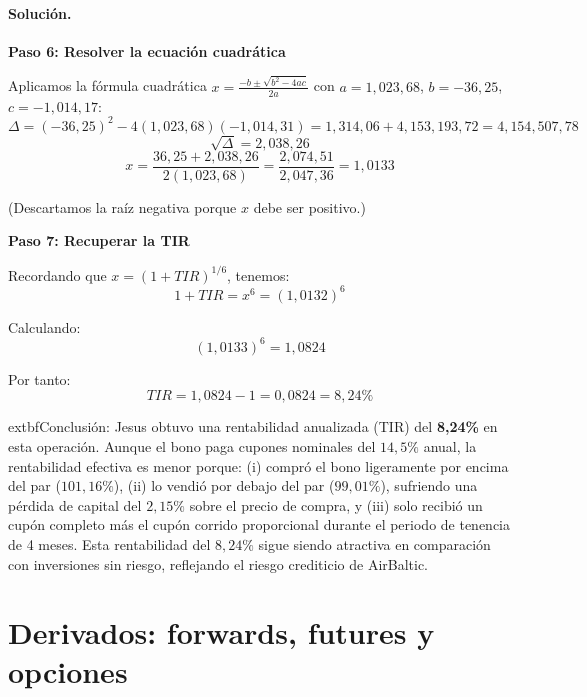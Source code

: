 \documentclass[12pt,a4paper]{article}
\newenvironment{solucion}{\paragraph{Solución.}}{}
\begin{document}
\begin{solucion}
\begin{enumerate}[label=\alph*)]
  \textbf{Paso 6: Resolver la ecuación cuadrática}
  
  Aplicamos la fórmula cuadrática \(x = \frac{-b \pm \sqrt{b^2 - 4ac}}{2a}\) con \(a = 1{,}023{,}68\), \(b = -36{,}25\), \(c = -1{,}014{,}17\):
  \[
  \Delta = (-36{,}25)^2 - 4(1{,}023{,}68)(-1{,}014{,}31) = 1{,}314{,}06 + 4{,}153{,}193{,}72 = 4{,}154{,}507{,}78
  \]
  \[
  \sqrt{\Delta} = 2{,}038{,}26
  \]
  \[
  x = \frac{36{,}25 + 2{,}038{,}26}{2(1{,}023{,}68)} = \frac{2{,}074{,}51}{2{,}047{,}36} = 1{,}0133
  \]
  
  (Descartamos la raíz negativa porque \(x\) debe ser positivo.)
  
  \textbf{Paso 7: Recuperar la TIR}
  
  Recordando que \(x = (1+TIR)^{1/6}\), tenemos:
  \[
  1 + TIR = x^6 = (1{,}0132)^6
  \]
  
  Calculando:
  \[
  (1{,}0133)^6 = 1{,}0824
  \]
  
  Por tanto:
  \[
  TIR = 1{,}0824 - 1 = 0{,}0824 = 8{,}24\%
  \]
  
  	extbf{Conclusión:} Jesus obtuvo una rentabilidad anualizada (TIR) del \textbf{8{,}24\%} en esta operación. Aunque el bono paga cupones nominales del \(14{,}5\%\) anual, la rentabilidad efectiva es menor porque: (i) compró el bono ligeramente por encima del par (\(101{,}16\%\)), (ii) lo vendió por debajo del par (\(99{,}01\%\)), sufriendo una pérdida de capital del \(2{,}15\%\) sobre el precio de compra, y (iii) solo recibió un cupón completo más el cupón corrido proporcional durante el periodo de tenencia de 4 meses. Esta rentabilidad del \(8{,}24\%\) sigue siendo atractiva en comparación con inversiones sin riesgo, reflejando el riesgo crediticio de AirBaltic.
\end{enumerate}
\end{solucion}

\section{Derivados: forwards, futures y opciones}
\end{document}
